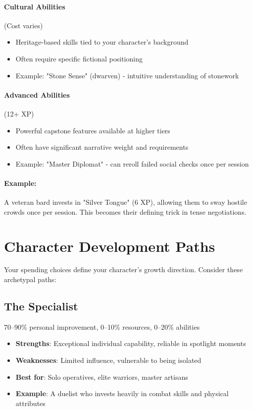 \paragraph{Cultural Abilities} (Cost varies) 
\begin{itemize}
\item Heritage-based skills tied to your character's background
\item Often require specific fictional positioning
\item Example: "Stone Sense" (dwarven) - intuitive understanding of stonework
\end{itemize}

\paragraph{Advanced Abilities} (12+ XP) 
\begin{itemize}
\item Powerful capstone features available at higher tiers
\item Often have significant narrative weight and requirements
\item Example: "Master Diplomat" - can reroll failed social checks once per session
\end{itemize}

\paragraph{Example:}  
A veteran bard invests in "Silver Tongue" (6 XP), allowing them to sway hostile crowds once per session. This becomes their defining trick in tense negotiations.

\section{Character Development Paths}

Your spending choices define your character's growth direction. Consider these archetypal paths:

\subsection*{The Specialist}
70–90\% personal improvement, 0–10\% resources, 0–20\% abilities
\begin{itemize}
\item \textbf{Strengths}: Exceptional individual capability, reliable in spotlight moments
\item \textbf{Weaknesses}: Limited influence, vulnerable to being isolated
\item \textbf{Best for}: Solo operatives, elite warriors, master artisans
\item \textbf{Example}: A duelist who invests heavily in combat skills and physical attributes
\end{itemize}

